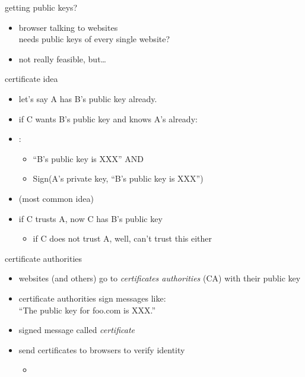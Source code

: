 \begin{frame}{getting public keys?}
    \begin{itemize}
    \item browser talking to websites \\
    needs public keys of every single website?
    \vspace{.5cm}
    \item not really feasible, but\ldots
    \end{itemize}
\end{frame}

\begin{frame}{certificate idea}
    \begin{itemize}
        \item let's say A has B's public key already.
        \item if C wants B's public key and knows A's already:
            \vspace{.5cm}
        \item {}:
            \begin{itemize}
            \item ``B's public key is XXX'' AND
            \item Sign(A's private key, ``B's public key is XXX'')
            \end{itemize}
        \item {} (most common idea)
        \item if C trusts A, now C has B's public key
            \begin{itemize}
            \item if C does not trust A, well, can't trust this either
            \end{itemize}
    \end{itemize}
\end{frame}

\begin{frame}{certificate authorities}
    \begin{itemize}
    \item websites (and others) go to \textit{certificates authorities} (CA) with their public key
    \item certificate authorities sign messages like: \\
        ``The public key for foo.com is XXX.''
    \item signed message called \textit{certificate}
    \item send certificates to browsers to verify identity
        \begin{itemize}
        \item {}
        \end{itemize}
    \end{itemize}
\end{frame}

